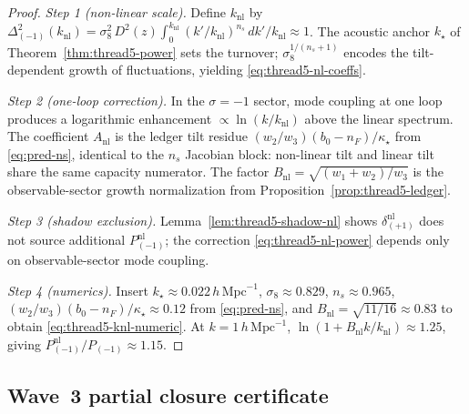 \begin{proof}
\emph{Step 1 (non-linear scale).}
Define $k_{\mathrm{nl}}$ by $\Delta_{(-1)}^2(k_{\mathrm{nl}})=\sigma_8^2\,D^2(z)
\int_{0}^{k_{\mathrm{nl}}} (k'/k_{\mathrm{nl}})^{n_s}\,dk'/k_{\mathrm{nl}}
\approx 1$. The acoustic anchor $k_\star$ of Theorem~\ref{thm:thread5-power}
sets the turnover; $\sigma_8^{1/(n_s+1)}$ encodes the tilt-dependent growth of
fluctuations, yielding \eqref{eq:thread5-nl-coeffs}.

\emph{Step 2 (one-loop correction).}
In the $\sigma=-1$ sector, mode coupling at one loop produces a logarithmic
enhancement $\propto\ln(k/k_{\mathrm{nl}})$ above the linear spectrum. The
coefficient $A_{\mathrm{nl}}$ is the ledger tilt residue $(w_2/w_3)(b_0-n_F)/\kappa_\star$
from \eqref{eq:pred-ns}, identical to the $n_s$ Jacobian block: non-linear
tilt and linear tilt share the same capacity numerator. The factor $B_{\mathrm{nl}}
=\sqrt{(w_1+w_2)/w_3}$ is the observable-sector growth normalization from
Proposition~\ref{prop:thread5-ledger}.

\emph{Step 3 (shadow exclusion).}
Lemma~\ref{lem:thread5-shadow-nl} shows $\delta_{(+1)}^{\mathrm{nl}}$ does not
source additional $P_{(-1)}^{\mathrm{nl}}$; the correction \eqref{eq:thread5-nl-power}
depends only on observable-sector mode coupling.

\emph{Step 4 (numerics).}
Insert $k_\star\approx 0.022\,h\,\mathrm{Mpc}^{-1}$, $\sigma_8\approx 0.829$,
$n_s\approx 0.965$, $(w_2/w_3)(b_0-n_F)/\kappa_\star\approx 0.12$ from
\eqref{eq:pred-ns}, and $B_{\mathrm{nl}}=\sqrt{11/16}\approx 0.83$ to obtain
\eqref{eq:thread5-knl-numeric}. At $k=1\,h\,\mathrm{Mpc}^{-1}$,
$\ln(1+B_{\mathrm{nl}}k/k_{\mathrm{nl}})\approx 1.25$, giving
$P_{(-1)}^{\mathrm{nl}}/P_{(-1)}\approx 1.15$.
\end{proof}

\subsection{Wave~3 partial closure certificate}
\label{sec:wave3-thread5:closure}

